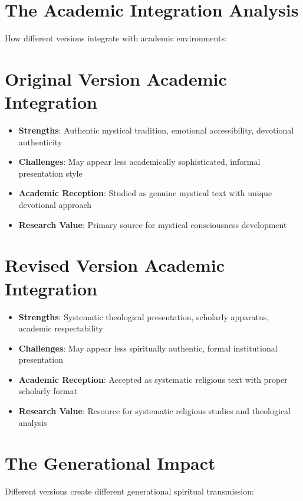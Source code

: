 \documentclass[11pt,twoside]{book}
\begin{document}
\section*{The Academic Integration Analysis}
\label{sec:org8aadbee}

How different versions integrate with academic environments:
\section*{Original Version Academic Integration}
\label{sec:org0fdb851}
\begin{itemize}
\item \textbf{\textbf{Strengths}}: Authentic mystical tradition, emotional accessibility, devotional authenticity
\item \textbf{\textbf{Challenges}}: May appear less academically sophisticated, informal presentation style
\item \textbf{\textbf{Academic Reception}}: Studied as genuine mystical text with unique devotional approach
\item \textbf{\textbf{Research Value}}: Primary source for mystical consciousness development
\end{itemize}
\section*{Revised Version Academic Integration}
\label{sec:orgd6eb8aa}
\begin{itemize}
\item \textbf{\textbf{Strengths}}: Systematic theological presentation, scholarly apparatus, academic respectability
\item \textbf{\textbf{Challenges}}: May appear less spiritually authentic, formal institutional presentation
\item \textbf{\textbf{Academic Reception}}: Accepted as systematic religious text with proper scholarly format
\item \textbf{\textbf{Research Value}}: Resource for systematic religious studies and theological analysis
\end{itemize}
\section*{The Generational Impact}
\label{sec:org6c124ee}

Different versions create different generational spiritual transmission:
\end{document}
